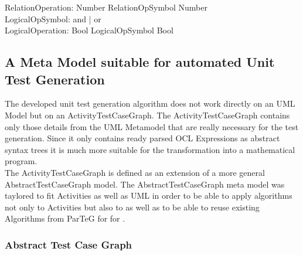 RelationOperation: Number RelationOpSymbol Number \\
LogicalOpSymbol: and | or \\
LogicalOperation: Bool LogicalOpSymbol Bool \\

\subsection{A Meta Model suitable for automated Unit Test Generation}
The developed unit test generation algorithm does not work directly on an UML Model but on an ActivityTestCaseGraph. The ActivityTestCaseGraph contains only those details from the UML Metamodel that are really necessary for the test generation. Since it only contains ready parsed OCL Expressions as abstract syntax trees it is much more suitable for the transformation into a mathematical program. \\
The ActivityTestCaseGraph is defined as an extension of a more general AbstractTestCaseGraph model. The AbstractTestCaseGraph meta model was taylored to fit Activities as well as UML  in order to be able to apply algorithms not only to Activities but also to  as well as to be able to reuse existing Algorithms from ParTeG for  for .


\subsubsection{Abstract Test Case Graph}

